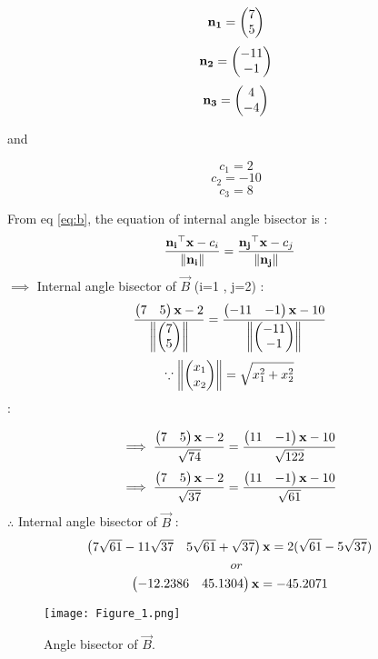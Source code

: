 \documentclass{article}
\begin{document}
     \[\mathbf{n_1} = \begin{pmatrix}7\\5\end{pmatrix}\] 
    \[ \mathbf{n_2} = \begin{pmatrix}-11\\-1\end{pmatrix} \]   
  \[ \mathbf{n_3} = \begin{pmatrix}4\\-4\end{pmatrix} \]
  
            and
   
    \[c_1 = 2\] 
 \[  c_2 = -10 \]
   \[c_3 = 8   \]
     
            
     From eq \ref{eq:b}, the equation of internal angle bisector is  : 
                 \begin{align}\frac{\mathbf{n_i}^{\top}\mathbf{x}-c_i}{\left\lVert\mathbf{n_i}\right\rVert} &= \frac{\mathbf{n_j}^{\top}\mathbf{x}-c_j}{\left\lVert{\mathbf{n_j}}\right\rVert} 
                 \end{align}
  $\implies$ Internal angle bisector of $\vec{B}$ (i=1 , j=2) : 
                  \begin{align}  \frac{\begin{pmatrix}7&5\end{pmatrix}\mathbf{x}-2}{\left\lVert\begin{pmatrix}7\\5\end{pmatrix}\right\rVert} &=\frac{\begin{pmatrix}-11&-1\end{pmatrix}\mathbf{x}-10}{\left\lVert{\ensuremath{\begin{pmatrix}-11\\-1\end{pmatrix}}}\right\rVert}
                  \end{align}
 \begin{align}\because  \left\lVert\begin{pmatrix}x_1\\x_2\end{pmatrix}\right\rVert &= \sqrt{x_1^2+x_2^2} 
 \end{align}  :
      
  \begin{align} \implies    \frac{\begin{pmatrix}7&5\end{pmatrix}\mathbf{x}-2}{\sqrt{74}} &=\frac{\begin{pmatrix}11&-1\end{pmatrix}\mathbf{x}-10}{\sqrt{122}}
  \end{align}                                
   \begin{align} \implies    \frac{\begin{pmatrix}7&5\end{pmatrix}\mathbf{x}-2}{\sqrt{37}} &=\frac{\begin{pmatrix}11&-1\end{pmatrix}\mathbf{x}-10}{\sqrt{61}}
   \end{align} 
    $\therefore$ Internal angle bisector of $\vec{B}$ :                                                          
\begin{align}    \begin{pmatrix}7\sqrt{61}-11\sqrt{37}&5\sqrt{61}+\sqrt{37}\end{pmatrix}\mathbf{x} &=2(\sqrt{61}-5\sqrt{37})
\end{align}   
                           \[or\]
     \begin{align}\begin{pmatrix}-12.2386&45.1304\end{pmatrix}\mathbf{x} &=-45.2071 
     \end{align}                         
     

\begin{figure}[htbp]
\centerline{\texttt{[image: Figure\_1.png]}}
\caption{Angle bisector of $\vec{B}$.}
\label{fig}
\end{figure}
\end{document}
